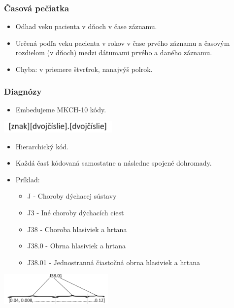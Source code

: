 \documentclass[slovak,10pt]{beamer}
\begin{document}
\begin{frame}
	\frametitle{Časová pečiatka}
	\begin{itemize}
		\item<1> Odhad veku pacienta v dňoch v čase záznamu.
		\item<1> Určená podľa veku pacienta v rokov v čase prvého záznamu a časovým rozdielom (v dňoch) medzi dátumami prvého a daného záznamu.
		\item<1> Chyba: v priemere štvrťrok, nanajvýš polrok.  
	\end{itemize}
\end{frame}

\begin{frame}
	\frametitle{Diagnózy}
	\begin{itemize}
		\item<1> Embedujeme MKCH-10 kódy.
	\end{itemize}

	\begin{center}
		\includegraphics[height=0.6cm]{images/ICD_code.png}
	\end{center}
	\begin{itemize}
		\item<1> Hierarchický kód.
		\item<1> Každá časť kódovaná samostatne a následne spojené dohromady.
		\item<1> Príklad:
		\begin{itemize}
		\item<1> J - Choroby dýchacej sústavy
		\item<1> J3 - Iné choroby dýchacích ciest 
		\item<1> J38 - Choroba hlasiviek a hrtana
		\item<1> J38.0 - Obrna hlasiviek a hrtana
		\item<1> J38.01 - Jednostranná čiastočná obrna hlasiviek a hrtana
	\end{itemize}
	\end{itemize}

	\begin{center}
		\includegraphics[height=1.6cm]{images/ICD_code_emb.png}
	\end{center}
\end{frame}
\end{document}
